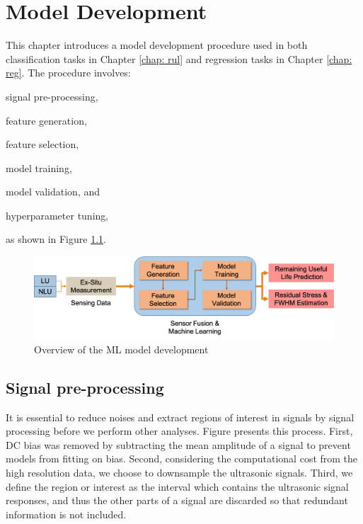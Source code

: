 \chapter{Model Development}
\label{chap: model}

This chapter introduces a model development procedure used in both classification tasks in Chapter \ref{chap: rul} and regression tasks in Chapter \ref{chap: reg}. The procedure involves:
\begin{enumerate*}[label=\itshape\alph*\upshape)]
    \item signal pre-processing,
    \item feature generation,
    \item feature selection,
    \item model training,
    \item model validation, and
    \item hyperparameter tuning,
\end{enumerate*}
as shown in Figure \ref{fig: model development}.

\begin{figure}[tb]
    \centering
    \includegraphics[width=\linewidth]{fig/model_development.png}
    \caption{Overview of the ML model development}
    \label{fig: model development}
\end{figure}

\section{Signal pre-processing}
It is essential to reduce noises and extract regions of interest in signals by signal processing before we perform other analyses. Figure presents this process. First, DC bias was removed by subtracting the mean amplitude of a signal to prevent models from fitting on bias. Second, considering the computational cost from the high resolution data, we choose to downsample the ultrasonic signals. Third, we define the region or interest as the interval which contains the ultrasonic signal responses, and thus the other parts of a signal are discarded so that redundant information is not included.

